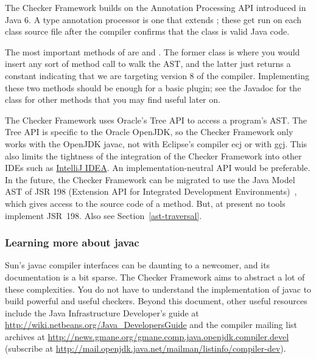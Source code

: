 The Checker Framework builds on the Annotation Processing API
introduced in Java 6.  A type annotation processor is one that extends
; these get run on each class
source file after the compiler confirms that the class is valid Java code.

The most important methods of 
are  and . The former
class is where you would insert any sort of method call to walk the AST\@,
and the latter just returns a constant indicating that we are targeting
version 8 of the compiler. Implementing these two methods should be enough
for a basic plugin; see the Javadoc for the class for other methods that
you may find useful later on.

The Checker Framework uses Oracle's Tree API to access a program's AST\@.
The Tree API is specific to the Oracle OpenJDK, so the Checker Framework only
works with the OpenJDK javac, not with Eclipse's compiler ecj or with
\href{http://gcc.gnu.org/java/}{gcj}.  This also limits the tightness of
the integration of the Checker Framework into other IDEs such as \href{http://www.jetbrains.com/idea/}{IntelliJ IDEA}\@.
An implementation-neutral API would be preferable.
In the future, the Checker Framework
can be migrated to use the Java Model AST of JSR 198 (Extension API for
Integrated Development Environments)~\cite{JSR198}, which gives access to
the source code of a method.  But, at present no tools
implement JSR~198.  Also see Section~\ref{ast-traversal}.



\subsubsection{Learning more about javac\label{learning-more-about-javac}}

Sun's javac compiler interfaces can be daunting to a
newcomer, and its documentation is a bit sparse. The Checker Framework
aims to abstract a lot of these complexities.
You do not have to understand the implementation of javac to
build powerful and useful checkers.
Beyond this document,
other useful resources include the Java Infrastructure
Developer's guide at
\url{http://wiki.netbeans.org/Java_DevelopersGuide} and the compiler
mailing list archives at
\url{http://news.gmane.org/gmane.comp.java.openjdk.compiler.devel}
(subscribe at
\url{http://mail.openjdk.java.net/mailman/listinfo/compiler-dev}).


